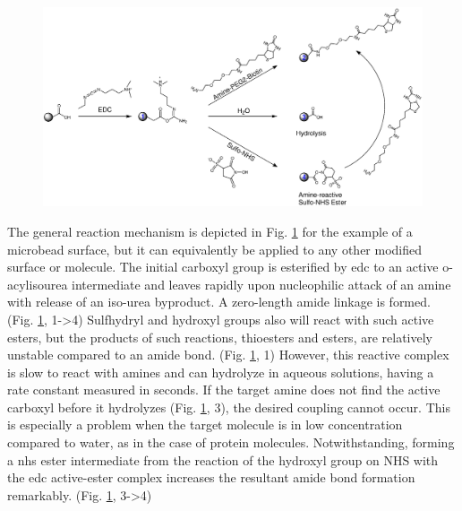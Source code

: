 \begin{figure}[htb!]
	\centering
	\includegraphics[width=\linewidth]{./Ressources/Chemistry/EDC-NHS.eps}
	\label{fig:chem:COOH-EDC-NHS}
\end{figure}
\clearpage
The general reaction mechanism is depicted in Fig. \ref{fig:chem:COOH-EDC-NHS} for the example of a microbead surface, but it can equivalently be applied to any other modified surface or molecule. The initial \gls{carboxyl} group is esterified by \gls{edc} to an active o-acylisourea intermediate and leaves rapidly upon nucleophilic attack of an amine with release of an iso-urea byproduct. A zero-length amide linkage is formed. (Fig. \ref{fig:chem:COOH-EDC-NHS}, 1->4) Sulfhydryl and hydroxyl groups also will react with such active esters, but the products of such reactions, thioesters and esters, are relatively unstable compared to an \gls{amide} bond. (Fig. \ref{fig:chem:COOH-EDC-NHS}, 1)\newline
However, this reactive complex is slow to react with amines and can hydrolyze in aqueous solutions, having a rate constant measured in seconds. If the target amine does not find the active \gls{carboxyl} before it hydrolyzes (Fig. \ref{fig:chem:COOH-EDC-NHS}, 3), the desired coupling cannot occur. This is especially a problem when the target molecule is in low concentration compared to water, as in the case of protein molecules. Notwithstanding, forming a \gls{nhs} ester intermediate from the reaction of the \gls{hydroxyl} group on NHS with the \gls{edc} active-ester complex increases the resultant amide bond formation remarkably. (Fig. \ref{fig:chem:COOH-EDC-NHS}, 3->4) \cite{lit:chem:nhs2}

